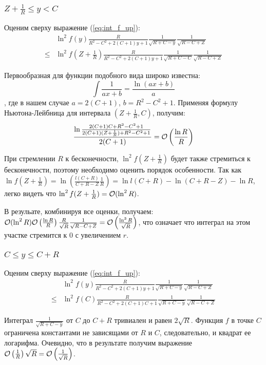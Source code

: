 \subsubsection{$Z + \frac{1}{R} \le y < C$}
Оценим сверху выражение (\ref{eq:int_f_up}):
\begin{align*}
       & \ln^2 f(y) \frac{R}{R^2 - C^2 + 2 (C + 1) y + 1} \frac{1}{\sqrt{R + C - y}} \frac{1}{\sqrt{R - C + Z}}
\\ \le & \ln^2 f(Z + \frac{1}{R}) \frac{R}{R^2 - C^2 + 2 (C + 1) y + 1} \frac{1}{\sqrt{R + C - C}} \frac{1}{\sqrt{R - C + Z}}
\end{align*}

Первообразная для функции подобного вида широко известна:
\[
\int \frac{1}{a x + b} = \frac{\ln (a x + b)}{a}
\]
, где в нашем случае $a = 2 (C + 1)$, $b = R^2 - C^2 + 1$. Применяя формулу Ньютона-Лейбница для интервала $(Z + \frac{1}{R}, C)$, получим:
\[
\frac{\ln \frac{2 (C + 1) C + R^2 - C^2 + 1}{2 (C + 1) (Z + \frac{1}{R}) + R^2 - C^2 + 1}}{2 (C + 1)} = \mathcal{O}\left( \frac{\ln R}{R} \right)
\]

При стремлении $R$ к бесконечности, $\ln^2 f(Z + \frac{1}{R})$ будет также стремиться к бесконечности, поэтому необходимо оценить порядок особенности. Так как $\ln f(Z + \frac{1}{R}) = \ln \left( \frac{l(C + R)}{C + R - Z} \frac{1}{R} \right) = \ln l(C + R) - \ln (C + R - Z) - \ln R$, легко видеть что $\ln^2 f(Z + \frac{1}{R}) = \mathcal{O} (\ln^2 R)$.

В резульате, комбинируя все оценки, получаем: $\mathcal{O} (\ln^2 R) \mathcal{O}\left( \frac{\ln R}{R} \right) \frac{R}{\sqrt{R}} \frac{1}{\sqrt{R - C + Z}} = \mathcal{O}\left( \frac{\ln^3 R}{\sqrt{R}} \right)$, что означает что интеграл на этом участке стремится к $0$ с увеличением $r$.

\subsubsection{$C \le y \le C + R$}

Оценим сверху выражение (\ref{eq:int_f_up}):
\begin{align*}
       & \ln^2 f(y) \frac{R}{R^2 - C^2 + 2 (C + 1) y + 1} \frac{1}{\sqrt{R + C - y}} \frac{1}{\sqrt{R - C + Z}}
\\ \le & \ln^2 f(C) \frac{R}{R^2 - C^2 + 2 (C + 1) C + 1} \frac{1}{\sqrt{R + C - y}} \frac{1}{\sqrt{R - C + Z}}
\end{align*}

Интеграл $\frac{1}{\sqrt{R + C - y}}$ от $C$ до $C + R$ тривиален и равен $2 \sqrt{R}$. Функция $f$ в точке $C$ ограничена константами не зависящами от $R$ и $C$, следовательно, и квадрат ее логарифма. Очевидно, что в результате получим выражение $\mathcal{O} \left( \frac{1}{R} \right) \sqrt R = \mathcal{O} \left( \frac{1}{\sqrt{R}} \right)$.

